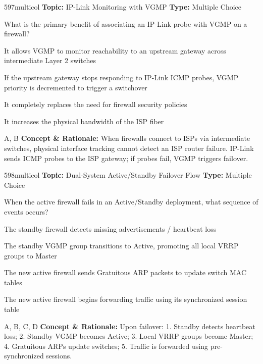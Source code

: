 \begin{qcard}{597}{multicol}
\textcolor{darkslate!75}{\small\textbf{Topic:} IP-Link Monitoring with VGMP \hfill \textbf{Type:} Multiple Choice}\vspace{0.4em}\par
What is the primary benefit of associating an IP-Link probe with VGMP on a firewall?
\begin{qoptions}
\item It allows VGMP to monitor reachability to an upstream gateway across intermediate Layer 2 switches
\item If the upstream gateway stops responding to IP-Link ICMP probes, VGMP priority is decremented to trigger a switchover
\item It completely replaces the need for firewall security policies
\item It increases the physical bandwidth of the ISP fiber
\end{qoptions}
\end{qcard}
\nopagebreak
\begin{explainbox}{A, B}
\textbf{Concept \& Rationale:} When firewalls connect to ISPs via intermediate switches, physical interface tracking cannot detect an ISP router failure. IP-Link sends ICMP probes to the ISP gateway; if probes fail, VGMP triggers failover.
\end{explainbox}

\begin{qcard}{598}{multicol}
\textcolor{darkslate!75}{\small\textbf{Topic:} Dual-System Active/Standby Failover Flow \hfill \textbf{Type:} Multiple Choice}\vspace{0.4em}\par
When the active firewall fails in an Active/Standby deployment, what sequence of events occurs?
\begin{qoptions}
\item The standby firewall detects missing advertisements / heartbeat loss
\item The standby VGMP group transitions to Active, promoting all local VRRP groups to Master
\item The new active firewall sends Gratuitous ARP packets to update switch MAC tables
\item The new active firewall begins forwarding traffic using its synchronized session table
\end{qoptions}
\end{qcard}
\nopagebreak
\begin{explainbox}{A, B, C, D}
\textbf{Concept \& Rationale:} Upon failover: 1. Standby detects heartbeat loss; 2. Standby VGMP becomes Active; 3. Local VRRP groups become Master; 4. Gratuitous ARPs update switches; 5. Traffic is forwarded using pre-synchronized sessions.
\end{explainbox}

